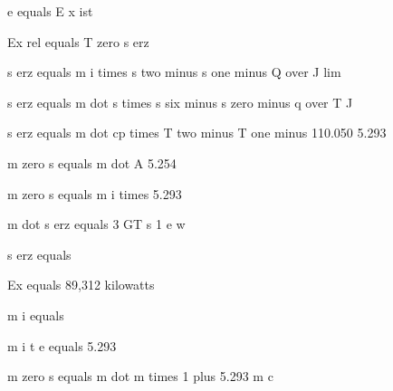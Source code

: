 e equals E x ist

Ex rel equals T zero s erz

s erz equals m i times s two minus s one minus Q over J lim

s erz equals m dot s times s six minus s zero minus q over T J

s erz equals m dot cp times T two minus T one minus 110.050 5.293

m zero s equals m dot A 5.254

m zero s equals m i times 5.293

m dot s erz equals 3 GT s 1 e w

s erz equals

Ex equals 89,312 kilowatts

m i equals

m i t e equals 5.293

m zero s equals m dot m times 1 plus 5.293 m c